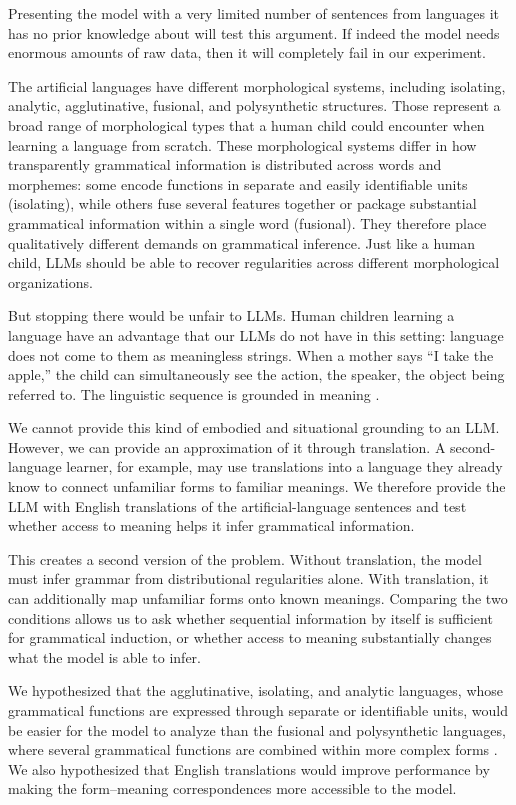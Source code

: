 \documentclass[11pt]{article}
\begin{document}
Presenting the model with a very limited number of sentences from languages it has no prior knowledge about will test this argument. If indeed the model needs enormous amounts of raw data, then it will completely fail in our experiment.~

The artificial languages have different morphological systems, including isolating, analytic, agglutinative, fusional, and polysynthetic structures. Those represent a broad range of morphological types that a human child could encounter when learning a language from scratch. These morphological systems differ in how transparently grammatical information is distributed across words and morphemes: some encode functions in separate and easily identifiable units (isolating), while others fuse several features together or package substantial grammatical information within a single word (fusional). They therefore place qualitatively different demands on grammatical inference. Just like a human child, LLMs should be able to recover regularities across different morphological organizations.~

But stopping there would be unfair to LLMs. Human children learning a language have an advantage that our LLMs do not have in this setting: language does not come to them as meaningless strings. When a mother says ``I take the apple,'' the child can simultaneously see the action, the speaker, the object being referred to. The linguistic sequence is grounded in meaning \citep{louwerse2018}.

We cannot provide this kind of embodied and situational grounding to an LLM. However, we can provide an approximation of it through translation. A second-language learner, for example, may use translations into a language they already know to connect unfamiliar forms to familiar meanings. We therefore provide the LLM with English translations of the artificial-language sentences and test whether access to meaning helps it infer grammatical information.

This creates a second version of the problem. Without translation, the model must infer grammar from distributional regularities alone. With translation, it can additionally map unfamiliar forms onto known meanings. Comparing the two conditions allows us to ask whether sequential information by itself is sufficient for grammatical induction, or whether access to meaning substantially changes what the model is able to infer.

We hypothesized that the agglutinative, isolating, and analytic languages, whose grammatical functions are expressed through separate or identifiable units, would be easier for the model to analyze than the fusional and polysynthetic languages, where several grammatical functions are combined within more complex forms \citep{dressler2005}. We also hypothesized that English translations would improve performance by making the form--meaning correspondences more accessible to the model.
\end{document}
